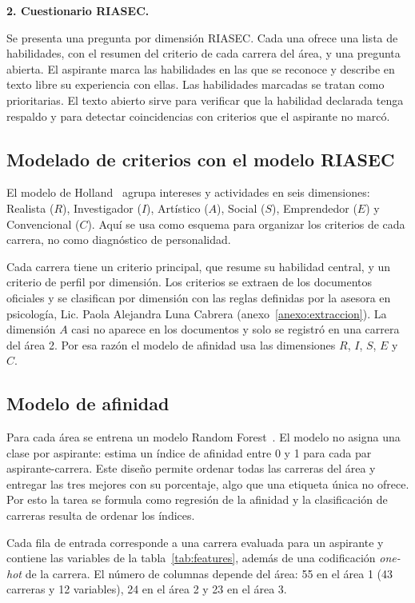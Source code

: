 \noindent\textbf{2. Cuestionario RIASEC.}\par\smallskip
Se presenta una pregunta por dimensión RIASEC. Cada una ofrece una lista de habilidades, con el resumen del criterio de cada carrera del área, y una pregunta abierta. El aspirante marca las habilidades en las que se reconoce y describe en texto libre su experiencia con ellas. Las habilidades marcadas se tratan como prioritarias. El texto abierto sirve para verificar que la habilidad declarada tenga respaldo y para detectar coincidencias con criterios que el aspirante no marcó.

\subsection{Modelado de criterios con el modelo RIASEC}
El modelo de Holland~\cite{Holland1997} agrupa intereses y actividades en seis dimensiones: Realista ($R$), Investigador ($I$), Artístico ($A$), Social ($S$), Emprendedor ($E$) y Convencional ($C$). Aquí se usa como esquema para organizar los criterios de cada carrera, no como diagnóstico de personalidad.

Cada carrera tiene un criterio principal, que resume su habilidad central, y un criterio de perfil por dimensión. Los criterios se extraen de los documentos oficiales y se clasifican por dimensión con las reglas definidas por la asesora en psicología, Lic. Paola Alejandra Luna Cabrera (anexo~\ref{anexo:extraccion}). La dimensión $A$ casi no aparece en los documentos y solo se registró en una carrera del área 2. Por esa razón el modelo de afinidad usa las dimensiones $R$, $I$, $S$, $E$ y $C$.

\subsection{Modelo de afinidad}
Para cada área se entrena un modelo Random Forest~\cite{Breiman2001}. El modelo no asigna una clase por aspirante: estima un índice de afinidad entre 0 y 1 para cada par aspirante-carrera. Este diseño permite ordenar todas las carreras del área y entregar las tres mejores con su porcentaje, algo que una etiqueta única no ofrece. Por esto la tarea se formula como regresión de la afinidad y la clasificación de carreras resulta de ordenar los índices.

Cada fila de entrada corresponde a una carrera evaluada para un aspirante y contiene las variables de la tabla~\ref{tab:features}, además de una codificación \textit{one-hot} de la carrera. El número de columnas depende del área: 55 en el área 1 (43 carreras y 12 variables), 24 en el área 2 y 23 en el área 3.

